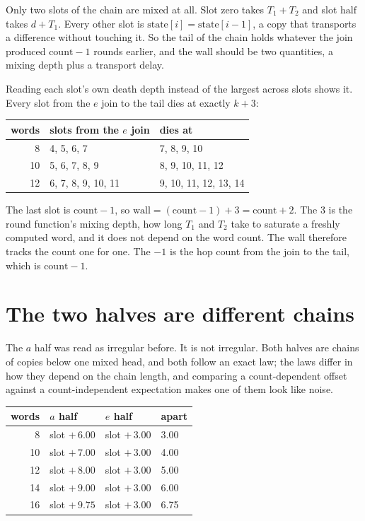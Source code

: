Only two slots of the chain are mixed at all. Slot zero takes \(T_1 + T_2\) and slot \(\mathrm{half}\) takes \(d + T_1\). Every other slot is \(\mathrm{state}[i] = \mathrm{state}[i-1]\), a copy that transports a difference without touching it. So the tail of the chain holds whatever the join produced \(\mathrm{count} - 1\) rounds earlier, and the wall should be two quantities, a mixing depth plus a transport delay.

Reading each slot's own death depth instead of the largest across slots shows it. Every slot from the \(e\) join to the tail dies at exactly \(k + 3\):

\begin{center}
\begin{tabular}{rll}
\toprule
words & slots from the \(e\) join & dies at \\
\midrule
8 & 4, 5, 6, 7 & 7, 8, 9, 10 \\
10 & 5, 6, 7, 8, 9 & 8, 9, 10, 11, 12 \\
12 & 6, 7, 8, 9, 10, 11 & 9, 10, 11, 12, 13, 14 \\
\bottomrule
\end{tabular}
\end{center}

The last slot is \(\mathrm{count} - 1\), so \(\mathrm{wall} = (\mathrm{count} - 1) + 3 = \mathrm{count} + 2\). The \(3\) is the round function's mixing depth, how long \(T_1\) and \(T_2\) take to saturate a freshly computed word, and it does not depend on the word count. The wall therefore tracks the count one for one. The \(-1\) is the hop count from the join to the tail, which is \(\mathrm{count} - 1\).

\section{The two halves are different chains}

The \(a\) half was read as irregular before. It is not irregular. Both halves are chains of copies below one mixed head, and both follow an exact law; the laws differ in how they depend on the chain length, and comparing a count-dependent offset against a count-independent expectation makes one of them look like noise.

\begin{center}
\begin{tabular}{rlll}
\toprule
words & \(a\) half & \(e\) half & apart \\
\midrule
8 & slot \(+\, 6.00\) & slot \(+\, 3.00\) & 3.00 \\
10 & slot \(+\, 7.00\) & slot \(+\, 3.00\) & 4.00 \\
12 & slot \(+\, 8.00\) & slot \(+\, 3.00\) & 5.00 \\
14 & slot \(+\, 9.00\) & slot \(+\, 3.00\) & 6.00 \\
16 & slot \(+\, 9.75\) & slot \(+\, 3.00\) & 6.75 \\
\bottomrule
\end{tabular}
\end{center}

